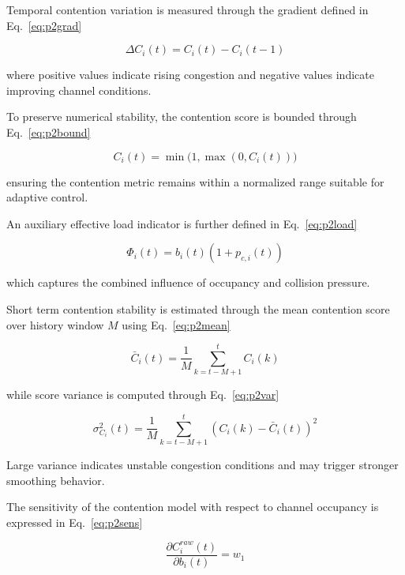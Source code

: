 \documentclass[a4paper,fleqn,final,1p]{cas-dc}
\numberwithin{equation}{section}
\begin{document}
Temporal contention variation is measured through the gradient defined in Eq.~\ref{eq:p2grad}

\begin{equation}
\Delta C_i(t)=
C_i(t)-C_i(t-1)
\label{eq:p2grad}
\end{equation}

where positive values indicate rising congestion and negative values indicate improving channel conditions.

To preserve numerical stability, the contention score is bounded through Eq.~\ref{eq:p2bound}

\begin{equation}
C_i(t)=
\min
\Big(
1,
\max(0,C_i(t))
\Big)
\label{eq:p2bound}
\end{equation}

ensuring the contention metric remains within a normalized range suitable for adaptive control.

An auxiliary effective load indicator is further defined in Eq.~\ref{eq:p2load}

\begin{equation}
\Phi_i(t)=
b_i(t)
\left(
1+p_{c,i}(t)
\right)
\label{eq:p2load}
\end{equation}

which captures the combined influence of occupancy and collision pressure.

Short term contention stability is estimated through the mean contention score over history window $M$ using Eq.~\ref{eq:p2mean}

\begin{equation}
\bar C_i(t)=
\frac1M
\sum_{k=t-M+1}^{t}
C_i(k)
\label{eq:p2mean}
\end{equation}

while score variance is computed through Eq.~\ref{eq:p2var}

\begin{equation}
\sigma_{C_i}^2(t)=
\frac1M
\sum_{k=t-M+1}^{t}
\left(
C_i(k)-\bar C_i(t)
\right)^2
\label{eq:p2var}
\end{equation}

Large variance indicates unstable congestion conditions and may trigger stronger smoothing behavior.

The sensitivity of the contention model with respect to channel occupancy is expressed in Eq.~\ref{eq:p2sens}

\begin{equation}
\frac{\partial C_i^{raw}(t)}
{\partial b_i(t)}
=
w_1
\label{eq:p2sens}
\end{equation}
\end{document}
